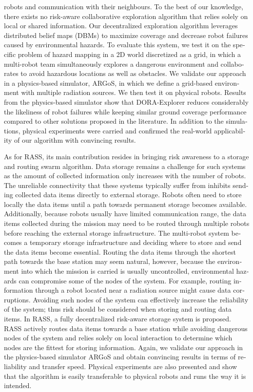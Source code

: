 \begin{otherlanguage}{english}
robots and communication with their neighbours. To the best of our knowledge, there exists no risk-aware collaborative exploration algorithm that relies solely on local or shared
information. Our decentralized exploration algorithm leverages distributed belief maps (DBMs) to maximize coverage and decrease robot failures caused by environmental hazards. To evaluate this system, we test it on the specific problem of
hazard mapping in a 2D world discretized as a grid, in which a
multi-robot team simultaneously explores a dangerous environment and
collaborates to avoid hazardous locations as well as obstacles. We validate our approach in a physics-based simulator, ARGoS, in which we define a grid-based environment
with multiple radiation sources. We then test it on physical
robots. Results from the physics-based simulator show that DORA-Explorer reduces considerably the likeliness of robot failures while keeping similar ground coverage performance compared to other solutions proposed in the literature. In addition to the simulations, physical experiments were carried and confirmed the real-world applicability of our algorithm with convincing results. 

As for RASS, its main contribution resides in bringing risk awareness to a storage and routing swarm algorithm. Data storage remains a challenge for such systems as the amount of collected information only increases with the number of robots. The unreliable connectivity that these systems typically suffer from inhibits sending collected data items directly to external storage. Robots often need to store locally the data items until a path towards permanent storage becomes available. Additionally, because robots usually have limited communication range, the data items collected during the mission may need to be routed through multiple robots before reaching the external storage infrastructure. The multi-robot system becomes a temporary storage infrastructure and deciding where to store and send the data items become essential. Routing the data items through the shortest path towards the base station may seem natural, however, because the environment into which the mission is carried is usually uncontrolled, environmental hazards can compromise some of the nodes of the system. For example, routing information through a robot located near a radiation source might cause data corruptions. Avoiding such nodes of the system can effectively increase the reliability of the system; thus risk should be considered when storing and routing data items. In RASS, a fully decentralized risk-aware storage system is proposed. RASS actively routes data items towards a base station while avoiding dangerous nodes of the system and relies solely on local interaction to determine which nodes are the fittest for storing information. Again, we validate our approach in the physics-based simulator ARGoS and obtain convincing results in terms of reliability and transfer speed. Physical experiments are also presented and show that the algorithm is easily transferable to physical robots and runs the way it is intended.
  


\end{otherlanguage}
